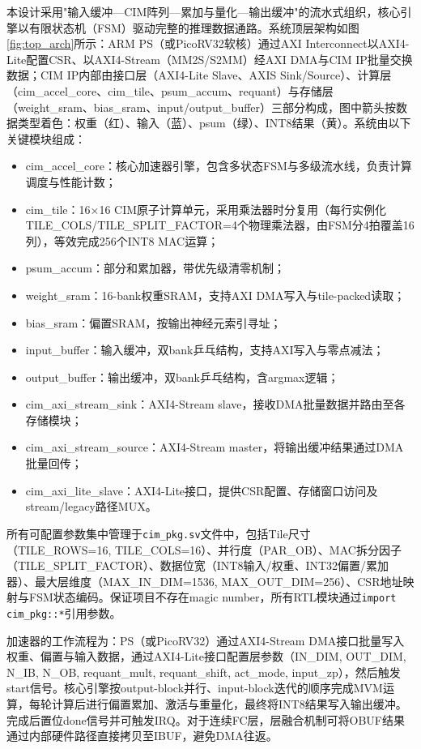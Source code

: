 \documentclass[bachelor,compact,nofont]{xjtuthesis}
\numberwithin{equation}{chapter}
\begin{document}
本设计采用"输入缓冲—CIM阵列—累加与量化—输出缓冲"的流水式组织，核心引擎以有限状态机（FSM）驱动完整的推理数据通路。系统顶层架构如图\ref{fig:top_arch}所示：ARM PS（或PicoRV32软核）通过AXI Interconnect以AXI4-Lite配置CSR、以AXI4-Stream（MM2S/S2MM）经AXI DMA与CIM IP批量交换数据；CIM IP内部由接口层（AXI4-Lite Slave、AXIS Sink/Source）、计算层（cim\_accel\_core、cim\_tile、psum\_accum、requant）与存储层（weight\_sram、bias\_sram、input/output\_buffer）三部分构成，图中箭头按数据类型着色：权重（红）、输入（蓝）、psum（绿）、INT8结果（黄）。系统由以下关键模块组成：
\begin{itemize}
	\item cim\_accel\_core：核心加速器引擎，包含多状态FSM与多级流水线，负责计算调度与性能计数；
	\item cim\_tile：16×16 CIM原子计算单元，采用乘法器时分复用（每行实例化\newline TILE\_COLS/TILE\_SPLIT\_FACTOR=4个物理乘法器，由FSM分4拍覆盖16列），等效完成256个INT8 MAC运算；
	\item psum\_accum：部分和累加器，带优先级清零机制；
	\item weight\_sram：16-bank权重SRAM，支持AXI DMA写入与tile-packed读取；
	\item bias\_sram：偏置SRAM，按输出神经元索引寻址；
	\item input\_buffer：输入缓冲，双bank乒乓结构，支持AXI写入与零点减法；
	\item output\_buffer：输出缓冲，双bank乒乓结构，含argmax逻辑；
	\item cim\_axi\_stream\_sink：AXI4-Stream slave，接收DMA批量数据并路由至各存储模块；
	\item cim\_axi\_stream\_source：AXI4-Stream master，将输出缓冲结果通过DMA批量回传；
	\item cim\_axi\_lite\_slave：AXI4-Lite接口，提供CSR配置、存储窗口访问及stream/legacy路径MUX。
\end{itemize}

所有可配置参数集中管理于\texttt{cim\_pkg.sv}文件中，包括Tile尺寸（TILE\_ROWS=16, TILE\_COLS=16）、并行度（PAR\_OB）、MAC拆分因子（TILE\_SPLIT\_FACTOR）、数据位宽（INT8输入/权重、INT32偏置/累加器）、最大层维度（MAX\_IN\_DIM=1536, MAX\_OUT\_DIM=256）、CSR地址映射与FSM状态编码。保证项目不存在magic number，所有RTL模块通过\texttt{import cim\_pkg::*}引用参数。

加速器的工作流程为：PS（或PicoRV32）通过AXI4-Stream DMA接口批量写入权重、偏置与输入数据，通过AXI4-Lite接口配置层参数（IN\_DIM, OUT\_DIM, N\_IB, N\_OB, requant\_mult, requant\_shift, act\_mode, input\_zp），然后触发start信号。核心引擎按output-block并行、input-block迭代的顺序完成MVM运算，每轮计算后进行偏置累加、激活与重量化，最终将INT8结果写入输出缓冲。完成后置位done信号并可触发IRQ。对于连续FC层，层融合机制可将OBUF结果通过内部硬件路径直接拷贝至IBUF，避免DMA往返。
\end{document}
